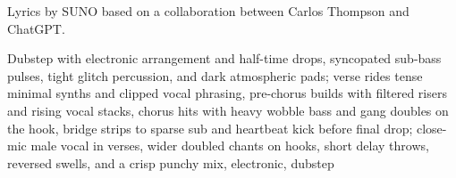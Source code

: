 
\begin{notes}
Lyrics by SUNO based on a collaboration between Carlos Thompson and ChatGPT.
\end{notes}
\begin{style}
Dubstep with electronic arrangement and half-time drops, syncopated sub-bass pulses, tight glitch percussion, and dark atmospheric pads; verse rides tense minimal synths and clipped vocal phrasing, pre-chorus builds with filtered risers and rising vocal stacks, chorus hits with heavy wobble bass and gang doubles on the hook, bridge strips to sparse sub and heartbeat kick before final drop; close-mic male vocal in verses, wider doubled chants on hooks, short delay throws, reversed swells, and a crisp punchy mix, electronic, dubstep
\end{style}
